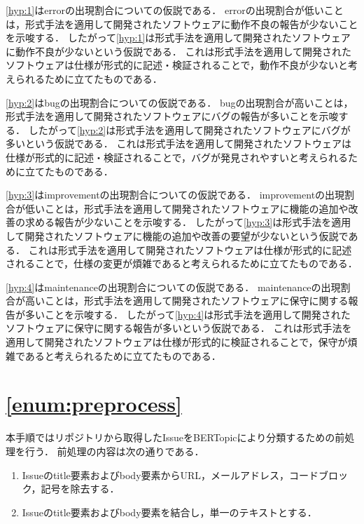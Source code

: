 \documentclass[main]{subfiles}
\begin{document}
\ref{hyp:1}はerrorの出現割合についての仮説である．
errorの出現割合が低いことは，形式手法を適用して開発されたソフトウェアに動作不良の報告が少ないことを示唆する．
したがって\ref{hyp:1}は形式手法を適用して開発されたソフトウェアに動作不良が少ないという仮説である．
これは形式手法を適用して開発されたソフトウェアは仕様が形式的に記述・検証されることで，動作不良が少ないと考えられるために立てたものである．

\ref{hyp:2}はbugの出現割合についての仮説である．
bugの出現割合が高いことは，形式手法を適用して開発されたソフトウェアにバグの報告が多いことを示唆する．
したがって\ref{hyp:2}は形式手法を適用して開発されたソフトウェアにバグが多いという仮説である．
これは形式手法を適用して開発されたソフトウェアは仕様が形式的に記述・検証されることで，バグが発見されやすいと考えられるために立てたものである．

\ref{hyp:3}はimprovementの出現割合についての仮説である．
improvementの出現割合が低いことは，形式手法を適用して開発されたソフトウェアに機能の追加や改善の求める報告が少ないことを示唆する．
したがって\ref{hyp:3}は形式手法を適用して開発されたソフトウェアに機能の追加や改善の要望が少ないという仮説である．
これは形式手法を適用して開発されたソフトウェアは仕様が形式的に記述されることで，仕様の変更が煩雑であると考えられるために立てたものである．

\ref{hyp:4}はmaintenanceの出現割合についての仮説である．
maintenanceの出現割合が高いことは，形式手法を適用して開発されたソフトウェアに保守に関する報告が多いことを示唆する．
したがって\ref{hyp:4}は形式手法を適用して開発されたソフトウェアに保守に関する報告が多いという仮説である．
これは形式手法を適用して開発されたソフトウェアは仕様が形式的に検証されることで，保守が煩雑であると考えられるために立てたものである．


\section{\ref{enum:preprocess}}
\label{sec:preprocess}

本手順ではリポジトリから取得したIssueをBERTopicにより分類するための前処理を行う．
前処理の内容は次の通りである．

\begin{enumerate}
	\item Issueのtitle要素およびbody要素からURL，メールアドレス，コードブロック，記号を除去する．
	\item Issueのtitle要素およびbody要素を結合し，単一のテキストとする．
\end{enumerate}
\end{document}
